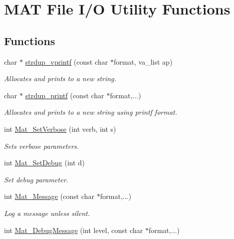 \hypertarget{group__mat__util}{}\section{M\+AT File I/O Utility Functions}
\label{group__mat__util}
\subsection*{Functions}
\begin{DoxyCompactItemize}
\item 
char $\ast$ \hyperlink{group__mat__util_ga2b342987d3b664345cb233640b611fe9}{strdup\+\_\+vprintf} (const char $\ast$format, va\+\_\+list ap)
\begin{DoxyCompactList}\small\item\em Allocates and prints to a new string. \end{DoxyCompactList}\item 
char $\ast$ \hyperlink{group__mat__util_ga291b08f933c75fb70e3736b669896ebd}{strdup\+\_\+printf} (const char $\ast$format,...)
\begin{DoxyCompactList}\small\item\em Allocates and prints to a new string using printf format. \end{DoxyCompactList}\item 
int \hyperlink{group__mat__util_gaf348b811ee26bfc923924878cea3c9ba}{Mat\+\_\+\+Set\+Verbose} (int verb, int s)
\begin{DoxyCompactList}\small\item\em Sets verbose parameters. \end{DoxyCompactList}\item 
int \hyperlink{group__mat__util_gad75e2962dcaf2ac366f2420bb5b13094}{Mat\+\_\+\+Set\+Debug} (int d)
\begin{DoxyCompactList}\small\item\em Set debug parameter. \end{DoxyCompactList}\item 
int \hyperlink{group__mat__util_gae7dfa394b111bc908a616f8f5bddaa97}{Mat\+\_\+\+Message} (const char $\ast$format,...)
\begin{DoxyCompactList}\small\item\em Log a message unless silent. \end{DoxyCompactList}\item 
int \hyperlink{group__mat__util_ga26e00cfb07551be5201fd9e0f04066d9}{Mat\+\_\+\+Debug\+Message} (int level, const char $\ast$format,...)

\end{DoxyCompactItemize}
